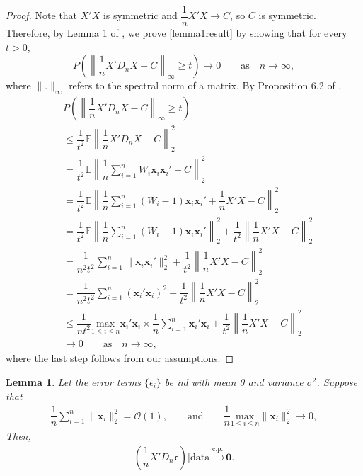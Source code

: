\documentclass[12pt]{article}
\newcommand{\EX}{\mathbb{E}} %
\newcommand{\ep}{\bm{\epsilon}} %
\newcommand{\sumin}{\sum_{i=1}^n} %
\newcommand{\dn}{\dfrac{1}{n}} %
\newcommand{\CONV}[1]{\stackrel{\text{#1}}{\longrightarrow}} %
\newcommand{\x}{\bm{x}_i} %
\newtheorem{lem}{Lemma}[section]
\begin{document}
\allowdisplaybreaks
\begin{proof}
	 Note that $X'X$ is symmetric and $\dn X'X \to C$, so $C$ is symmetric. Therefore, by Lemma 1 of \citet{strawderman1994}, we prove \eqref{lemma1result} by showing that for every $t > 0$,
	 $$
	 P \left( 
	 		\left\| 
	 				\dn X' D_n X - C 
	 		\right\|_\infty 
	 		\geq t 
	 	\right) 
	 \to 0 \qquad \text{as} \quad n \to \infty,
	 $$
	 where $\|.\|_\infty$ refers to the spectral norm of a matrix. By Proposition 6.2 of \citet{MatrixChebyshev}, 
	 \begin{align*}
	 	&P \left( 
	 			\left\| 
	 					\dn X' D_n X - C 
	 			\right\|_\infty 
	 			\geq t 
	 		\right) \\ 
	 	&\leq \dfrac{1}{t^2} 
	 		   \EX \left\| 
	 		   			  \dn X' D_n X - C 
	 		   		\right\|_2^2 \\
	 	&= \dfrac{1}{t^2} 
	 		\EX \left\| 
	 				   \dn \sumin W_i \x \x' - C 
	 			\right\|_2^2 \\
	 	&= \dfrac{1}{t^2} 
	 		\EX \left\| 
	 					\dn \sumin (W_i - 1) \x \x' 
	 					+ \dn X'X - C 
	 			\right\|_2^2 \\
	 	&= \dfrac{1}{t^2} 
	 		\EX \left\| 
	 				   \dn \sumin (W_i - 1) \x \x' 
	 			 \right\|_2^2 
	 	  + \dfrac{1}{t^2} 
	 		\left\|  
	 			   \dn X'X - C
	 		\right\|_2^2 \\
	 	&= \dfrac{1}{n^2 t^2}
	 		\sumin \| \x \x' \|^2_2
	 	  + \dfrac{1}{t^2} 
			\left\|  
				  \dn X'X - C
			\right\|_2^2 \\
	 	&= \dfrac{1}{n^2 t^2}
	 		\sumin (\x' \x)^2
	 	  + \dfrac{1}{t^2} 
	 		\left\|  
	 		  	  \dn X'X - C
	 		\right\|_2^2 \\
	 	&\leq \dfrac{1}{n t^2} \underset{1 \leq i \leq n}{\text{max}} \x' \x
	 		   \times
	 		   \dn \sumin \x' \x
	 		 + \dfrac{1}{t^2} 
	 		   \left\|  
	 				  \dn X'X - C
	 		   \right\|_2^2 \\
	 	&\to 0 \qquad \text{as} \quad n \to \infty,  	
	 \end{align*}
 	 where the last step follows from our assumptions.  
\end{proof}

\begin{lem} \label{lem_X'DnEp}
	Let the error terms $\{\epsilon_i\}$ be iid with mean 0 and variance $\sigma^2$. Suppose that
	\begin{align*}
		\dn \sumin \| \x  \|_2^2 = \mathcal{O} (1),
		\qquad \text{and} \qquad
		\dn \underset{1 \leq i \leq n}{\text{max}} \| \x  \|_2^2 \to 0, 
	\end{align*}
	Then,  
	\begin{align}
	\left(
		 \dn X'D_n \ep 
	\right) 
	\bigg| \text{data} 
	\CONV{c.p.} \bm{0}.
	\end{align}   
\end{lem}
\end{document}
